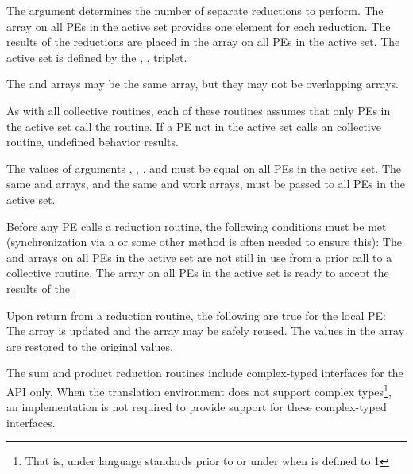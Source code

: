 \begin{apidefinition}
{    The  argument determines the number of separate reductions to
    perform.  The \source{} array on all \acp{PE} in the active set provides one
    element for each reduction.  The results of the reductions are placed in the
    \dest{} array on all \acp{PE} in the active set.  The active set is defined
    by the , ,  triplet.

    The \source{} and \dest{} arrays may be the same array, but they may not be
    overlapping arrays.

    As with all \openshmem collective routines, each of these routines assumes
    that only \acp{PE} in the active set call the routine.  If a \ac{PE} not in
    the active set calls an \openshmem collective routine, undefined behavior
    results.

    The values of arguments , , , and
     must be equal on all \acp{PE} in the active set. The same \dest{}
    and \source{} arrays, and the same  and  work arrays, must
    be passed to all \acp{PE} in the active set.
    
    Before any \ac{PE} calls a reduction routine, the
    following conditions must be met (synchronization via a  or some other
    method is often needed to ensure this): The  and  arrays
    on all \acp{PE} in the active set are not still in use from a prior call to a
    collective \openshmem routine.  The \dest{} array on all \acp{PE} in the
    active set is ready to accept the results of the .

    Upon return from a reduction routine, the following are true for the local
    \ac{PE}: The \dest{} array is updated and the \source{} array may be safely reused.
    The values in the  array are
    restored to the original values.

    The sum and product reduction routines include complex-typed
    interfaces for the \Cstd API only. When the \Cstd translation
    environment does not support complex types\footnote{That is, under
    \Cstd language standards prior to \Cstd[99] or under \Cstd[11] when
     is defined to 1}, an \openshmem
    implementation is not required to provide support for these
    complex-typed interfaces.
}



\end{apidefinition}
